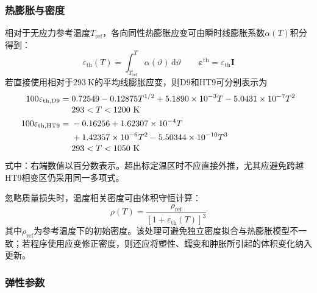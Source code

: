\subsubsection{热膨胀与密度}

相对于无应力参考温度$T_{\mathrm{ref}}$，各向同性热膨胀应变可由瞬时线膨胀系数$\alpha(T)$积分得到：
\begin{equation}
	\varepsilon_{\mathrm{th}}(T)
	=\int_{T_{\mathrm{ref}}}^{T}\alpha(\vartheta)\,\mathrm d\vartheta
	\qquad
	\boldsymbol{\varepsilon}^{\mathrm{th}}
	=\varepsilon_{\mathrm{th}}\boldsymbol I
	\label{eq:clad_thermal_strain_general}
\end{equation}
若直接使用相对于$293\ \mathrm{K}$的平均线膨胀应变，则D9和HT9可分别表示为\cite{Leibowitz_1988,hofmanMetallicFuelsHandbook2019}
\begin{subequations}\label{eq:clad_d9_ht9_thermal_expansion}
	\begin{align}
		100\varepsilon_{\mathrm{th,D9}}
		={}&0.72549-0.12875T^{1/2}
		+5.1890\times10^{-3}T
		-5.0431\times10^{-7}T^2
		\nonumber\\[-0.2em]
		&293<T<1200\ \mathrm{K}
		\label{eq:d9_thermal_expansion}\\
		100\varepsilon_{\mathrm{th,HT9}}
		={}&-0.16256+1.62307\times10^{-4}T
		\notag\\
		&+1.42357\times10^{-6}T^2
		-5.50344\times10^{-10}T^3
		\nonumber\\[-0.2em]
		&293<T<1050\ \mathrm{K}
		\label{eq:ht9_thermal_expansion}
	\end{align}
\end{subequations}
式中：右端数值以百分数表示。超出标定温区时不应直接外推，尤其应避免跨越HT9相变区仍采用同一多项式。

忽略质量损失时，温度相关密度可由体积守恒计算：
\begin{equation}
	\rho(T)
	=\frac{\rho_{\mathrm{ref}}}
	{\left[1+\varepsilon_{\mathrm{th}}(T)\right]^3}
	\label{eq:clad_density_from_thermal_strain}
\end{equation}
其中$\rho_{\mathrm{ref}}$为参考温度下的初始密度。该处理可避免独立密度拟合与热膨胀模型不一致；若程序使用应变修正密度，则还应将塑性、蠕变和肿胀所引起的体积变化纳入更新。

\label{sec:cladding_elastoplastic_response}

\subsubsection{弹性参数}

